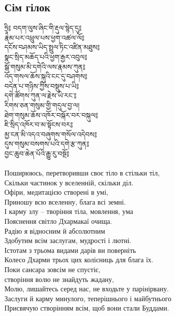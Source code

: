 \subsection{Сім гілок}
\ti
ཧྲཱི༔ བདག་ལུས་ཞིང་གི་རྡུལ་སྙེད་དུ༔\\
རྣམ་པར་འཕྲུལ་པས་ཕྱག་འཚལ་ལོ༔\\
དངོས་བཤམས་ཡིད་སྤྲུལ་ཏིང་འཛིན་མཐུས༔\\
སྣང་སྲིད་མཆོད་པའི་ཕྱག་རྒྱར་འབུལ༔\\
སྒོ་གསུམ་མི་དགེའི་ལས་རྣམས་ཀུན༔\\
འོད་གསལ་ཆོས་སྐུའི་ངང་དུ་བཤགས༔\\
བདེན་པ་གཉིས་ཀྱིས་བསྡུས་པ་ཡི༔\\
དགེ་ཚོགས་ཀུན་ལ་རྗེས་ཡི་རང་༔\\
རིགས་ཅན་གསུམ་གྱི་གདུལ་བྱ་ལ།\\
ཐེག་གསུམ་ཆོས་འཁོར་བསྐོར་བར་བསྐུལ༔\\
ཇི་སྲིད་འཁོར་བ་མ་སྟོངས་བར༔ \\
མྱ་ངན་མི་འདའ་བཞུགས་གསོལ་འདེབས༔ \\
དུས་གསུམ་བསགས་པའི་དགེ་རྩ་ཀུན༔ \\
བྱང་ཆུབ་ཆེན་པོའི་རྒྱུ་རུ་བསྔོ༔ \\
\\
\ru
Поширююсь, перетворивши своє тіло в стільки тіл,\\
Скільки частинок у вселенній, скільки діл.\\
Офіри, медитацією створені в умі,\\
Приношу всю вселенну, блага всі земні.\\
І карму злу -- творіння тіла, мовлення, ума\\
Пояснення світло Дхармакаї очища.\\
Радію я відносним й абсолютним\\
Здобутим всім заслугам, мудрості і лютні.\\
Істотам з трьома видами дарів ви поверніть\\
Колесо Дхарми трьох цих колісниць для блага їх.\\
Поки сансара зовсім не спустіє, \\
\indent створіння волю не знайдуть жадану,\\
Молю, лишайтесь серед нас, не входьте у парінірвану.\\
Заслуги й карму минулого, теперішнього і майбутнього\\
Присвячую створінням всім, щоб вони стали Буддами.

